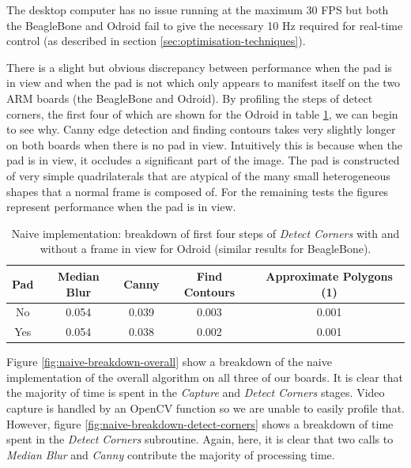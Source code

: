 \documentclass{acm_proc_article-sp}
\begin{document}
The desktop computer has no issue running at the maximum 30 FPS but both the BeagleBone and Odroid fail to give the necessary 10 Hz required for real-time control (as described in section \ref{sec:optimisation-techniques}). 

There is a slight but obvious discrepancy between performance when the pad is in view and when the pad is not which only appears to manifest itself on the two ARM boards (the BeagleBone and Odroid). By profiling the steps of detect corners, the first four of which are shown for the Odroid in table \ref{tab:naive-frame-vs-no-frame}, we can begin to see why. Canny edge detection and finding contours takes very slightly longer on both boards when there is no pad in view. Intuitively this is because when the pad is in view, it occludes a significant part of the image. The pad is constructed of very simple quadrilaterals that are atypical of the many small heterogeneous shapes that a normal frame is composed of. For the remaining tests the figures represent performance when the pad is in view.

\begin{table}[htbp]
  \centering
    \begin{tabular}{ccccc}
    \toprule
    \textbf{Pad} & \textbf{Median Blur} & \textbf{Canny} & \textbf{Find Contours} & \textbf{Approximate Polygons (1)} \\
    \midrule
    No    & 0.054 & 0.039 & 0.003 & 0.001 \\
    Yes   & 0.054 & 0.038 & 0.002 & 0.001 \\
    \bottomrule
    \end{tabular}%
  \caption{Naive implementation: breakdown of first four steps of \textit{Detect Corners} with and without a frame in view for Odroid (similar results for BeagleBone).}%
  \label{tab:naive-frame-vs-no-frame}%
\end{table}%
 
Figure \ref{fig:naive-breakdown-overall} show a breakdown of the naive implementation of the overall algorithm on all three of our boards. It is clear that the majority of time is spent in the \textit{Capture} and \textit{Detect Corners} stages. Video capture is handled by an OpenCV function so we are unable to easily profile that. However, figure \ref{fig:naive-breakdown-detect-corners} shows a breakdown of time spent in the \textit{Detect Corners} subroutine. Again, here, it is clear that two calls to \textit{Median Blur} and \textit{Canny} contribute the majority of processing time.
\end{document}

